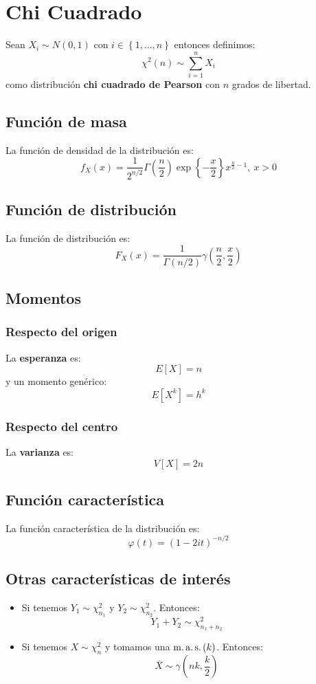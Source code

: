 \section{Chi Cuadrado}
\label{sec:chi_cuadrado}
Sean $X_i \sim N\left( 0, 1 \right)$ con $i \in \left\{ 1, \ldots, n \right\}$ entonces definimos:
\[
\chi^2\left( n \right) \sim \sum_{i=1}^{n} X_i
\]
como distribución \textbf{chi cuadrado de Pearson} con $n$ grados de libertad.

\subsection{Función de masa}
La función de densidad de la distribución es:
\[
f_X \left( x \right) = \frac{1}{2^{n/2}}\Gamma\left( \frac{n}{2} \right)\exp\left\{ -\frac{x}{2} \right\} x^{\frac{n}{2} - 1},\ x > 0
\]

\subsection{Función de distribución}
La función de distribución es:
\[
F_X\left( x \right) = \frac{1}{\Gamma\left( n / 2 \right)}\gamma\left( \frac{n}{2}, \frac{x}{2} \right)
\]

\subsection{Momentos}

\subsubsection*{Respecto del origen}
La \textbf{esperanza} es: 
\[
    E\left[ X \right] = n
\]
y un momento genérico: 
\[
    E\left[ X^k \right] = h^k
\]
\subsubsection*{Respecto del centro}
La \textbf{varianza} es:
\[
    V\left[ X \right] = 2n
\]

\subsection{Función característica}
La función característica de la distribución es:
\[
\varphi\left( t \right) = \left( 1 - 2it \right)^{-n/2}
\]

\subsection{Otras características de interés}
\begin{itemize}
    \item Si tenemos $Y_1 \sim \chi^2_{n_1}$ y $Y_2 \sim \chi^2_{n_2}$. Entonces:
    \[
    Y_1 + Y_2 \sim \chi^2_{n_1 + n_2}
    \]
    \item Si tenemos $X \sim \chi^2_n$ y tomamos una $\operatorname{m.a.s.}\left( k \right)$. Entonces:
    \[
    \overline{X} \sim \gamma\left( nk, \frac{k}{2} \right)
    \]
\end{itemize}
